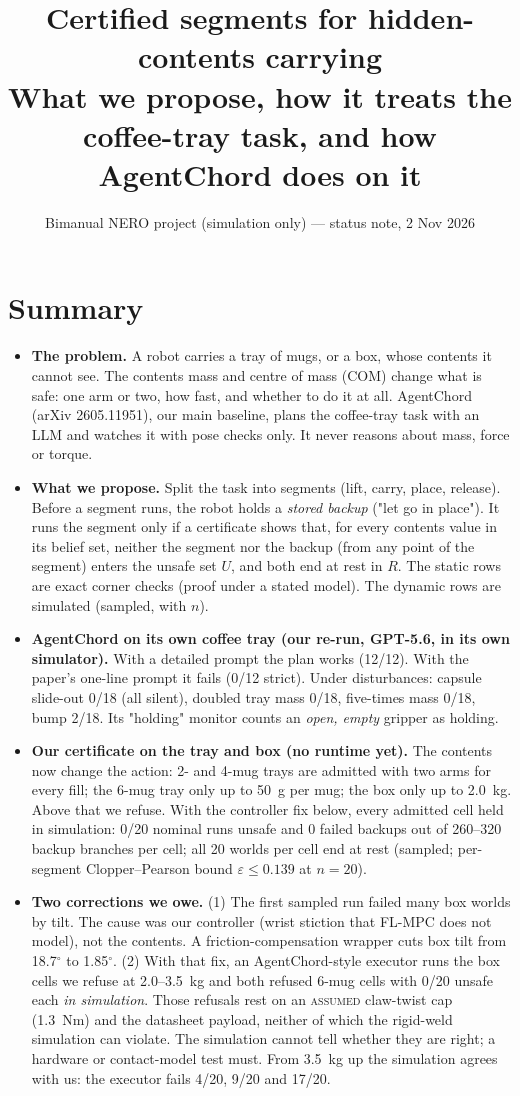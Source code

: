 \documentclass[11pt,a4paper]{article}
\title{\textbf{Certified segments for hidden-contents carrying}\\[2pt]
\large What we propose, how it treats the coffee-tray task, and how AgentChord does on it}
\author{Bimanual NERO project (simulation only) \quad--- status note, 2 Nov 2026}
\date{}
\newcommand{\lab}[1]{\textsc{#1}}
\begin{document}
\maketitle
\vspace{-1.5em}

\section*{Summary}
\begin{itemize}
\item \textbf{The problem.} A robot carries a tray of mugs, or a box, whose contents it cannot see. The contents mass and
centre of mass (COM) change what is safe: one arm or two, how fast, and whether to do it at all. AgentChord (arXiv 2605.11951),
our main baseline, plans the coffee-tray task with an LLM and watches it with pose checks only. It never reasons about mass,
force or torque.
\item \textbf{What we propose.} Split the task into segments (lift, carry, place, release). Before a segment runs, the robot
holds a \emph{stored backup} ("let go in place"). It runs the segment only if a certificate shows that, for every contents
value in its belief set, neither the segment nor the backup (from any point of the segment) enters the unsafe set $U$, and
both end at rest in $R$. The static rows are exact corner checks (proof under a stated model). The dynamic rows are
simulated (sampled, with $n$).
\item \textbf{AgentChord on its own coffee tray (our re-run, GPT-5.6, in its own simulator).} With a detailed prompt the plan
works (12/12). With the paper's one-line prompt it fails (0/12 strict). Under disturbances: capsule slide-out 0/18 (all
silent), doubled tray mass 0/18, five-times mass 0/18, bump 2/18. Its "holding" monitor counts an \emph{open, empty} gripper as
holding.
\item \textbf{Our certificate on the tray and box (no runtime yet).} The contents now change the action: 2- and 4-mug trays are
admitted with two arms for every fill; the 6-mug tray only up to 50~g per mug; the box only up to 2.0~kg. Above that we refuse.
With the controller fix below, every admitted cell held in simulation: 0/20 nominal runs unsafe and 0 failed backups out of
260--320 backup branches per cell; all 20 worlds per cell end at rest (sampled; per-segment Clopper--Pearson bound
$\varepsilon\le0.139$ at $n=20$).
\item \textbf{Two corrections we owe.} (1) The first sampled run failed many box worlds by tilt. The cause was our controller
(wrist stiction that FL-MPC does not model), not the contents. A friction-compensation wrapper cuts box tilt from 18.7$^\circ$
to 1.85$^\circ$. (2) With that fix, an AgentChord-style executor runs the box cells we refuse at 2.0--3.5~kg and both refused
6-mug cells with 0/20 unsafe each \emph{in simulation}. Those refusals rest on an \lab{assumed} claw-twist cap (1.3~Nm) and the
datasheet payload, neither of which the rigid-weld simulation can violate. The simulation cannot tell whether they are right; a
hardware or contact-model test must. From 3.5~kg up the simulation agrees with us: the executor fails 4/20, 9/20 and 17/20.
\end{itemize}
\end{document}
